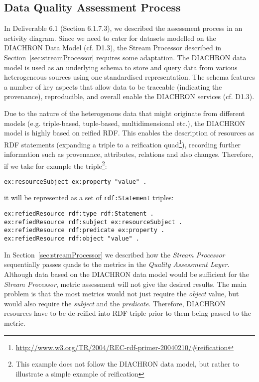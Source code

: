 
\subsection{Data Quality Assessment Process}
\label{sec:DQAssessment} 
In Deliverable 6.1 (Section 6.1.7.3), we described the assessment process in an activity diagram.
Since we need to cater for datasets modelled on the DIACHRON Data Model (cf. D1.3), the Stream Processor described in Section~\ref{sec:streamProcessor} requires some adaptation.
The DIACHRON data model is used as an underlying schema to store and query data from various heterogeneous sources using one standardised representation.
The schema features a number of key aspects that allow data to be traceable (indicating the provenance), reproducible, and overall enable the DIACHRON services (cf. D1.3).

Due to the nature of the heterogenous data that might originate from different models (e.g. triple-based, tuple-based, multidimensional etc.), the DIACHRON model is highly based on reified RDF.
This enables the description of resources as RDF statements (expanding a triple to a reification quad\footnote{\url{http://www.w3.org/TR/2004/REC-rdf-primer-20040210/#reification}}), recording further information such as provenance, attributes, relations and also changes.
Therefore, if we take for example the triple\footnote{This example does not follow the DIACHRON data model, but rather to illustrate a simple example of reification}:
\begin{lstlisting}[language=RDF]
ex:resourceSubject ex:property "value" .
\end{lstlisting}
it will be represented as a set of \texttt{rdf:Statement} triples:
\begin{lstlisting}[language=RDF]
ex:refiedResource rdf:type rdf:Statement .
ex:refiedResource rdf:subject ex:resourceSubject .
ex:refiedResource rdf:predicate ex:property .
ex:refiedResource rdf:object "value" .
\end{lstlisting}

In Section~\ref{sec:streamProcessor} we described how the \emph{Stream Processor} sequentially passes quads to the metrics in the \emph{Quality Assessment Layer}.
Although data based on the DIACHRON data model would be sufficient for the \emph{Stream Processor}, metric assessment will not give the desired results.
The main problem is that the most metrics would not just require the \emph{object} value, but would also require the \emph{subject} and the \emph{predicate}.
Therefore, DIACHRON resources have to be de-reified into RDF triple prior to them being passed to the metric.



